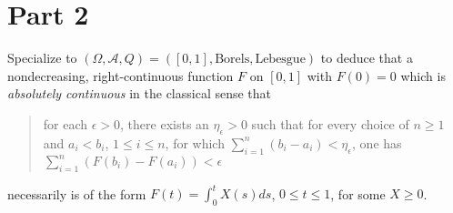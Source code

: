 \documentclass[letterpaper, 12pt]{article}
\newcommand{\cA}{\mathcal{A}}
\newcommand{\sion}{\sum_{i=1}^n}
\begin{document}
\section*{Part 2}
Specialize to $(\Omega, \cA, Q) = ([0, 1], \text{Borels}, \text{Lebesgue})$ to deduce that a nondecreasing, right-continuous function $F$ on $[0,1]$ with $F(0) = 0$ which is \textit{absolutely continuous} in the classical sense that 
\begin{quote}
for each $\epsilon > 0$, there exists an $\eta_\epsilon > 0$ such that for every choice of $n \geq 1$ and $a_i < b_i$, $1 \leq i \leq n$, for which $\sion (b_i - a_i) < \eta_\epsilon$, one has $\sion (F(b_i) - F(a_i)) < \epsilon$
\end{quote}
necessarily is of the form $F(t) = \int_0^t X(s) ds$, $0 \leq t \leq 1$, for some $X \geq 0$.
\end{document}
